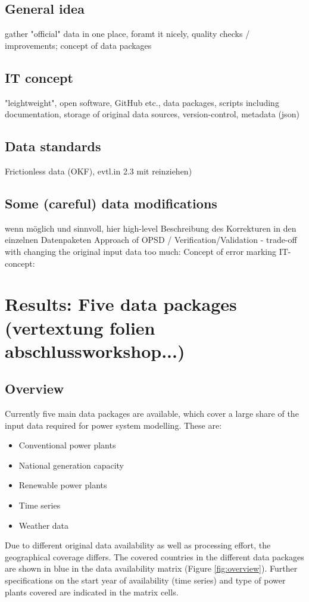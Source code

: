 \documentclass[article]{elsarticle}
\begin{document}
\subsection{General idea}
gather "official" data in one place, foramt it nicely, quality checks / improvements; concept of data packages 

\subsection{IT concept}
"leightweight", open software, GitHub etc., data packages, scripts including documentation, storage of original data sources, version-control, metadata (json)

\subsection{Data standards}
Frictionless data (OKF), evtl.in 2.3 mit reinziehen)

\subsection{Some (careful) data modifications}
wenn möglich und sinnvoll, hier high-level Beschreibung des Korrekturen in den einzelnen Datenpaketen Approach of OPSD / Verification/Validation - trade-off with changing the original input data too much: Concept of error marking IT-concept: 

\section{Results: Five data packages (vertextung folien abschlussworkshop...)}
\label{sec:packages}
\subsection{Overview}
Currently five main data packages are available, which cover a large share of the input data required for power system modelling. These are:
\begin{itemize}
    \item Conventional power plants
    \item National generation capacity
    \item Renewable power plants
    \item Time series
    \item Weather data
\end{itemize}

Due to different original data availability as well as processing effort, the geographical coverage differs. The covered countries in the different data packages are shown in blue in the data availability matrix (Figure \ref{fig:overview}). Further specifications on the start year of availability (time series) and type of power plants covered are indicated in the matrix cells.
\end{document}
